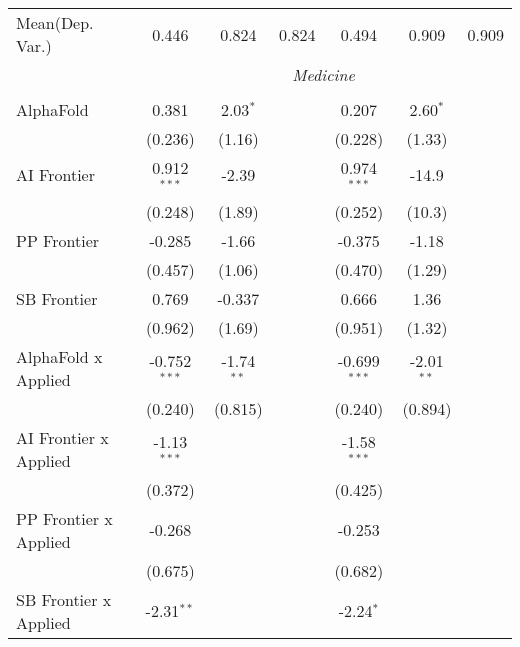 \begin{tabular}{lcccccc}
Mean(Dep. Var.) & 0.446 & 0.824 & 0.824 & 0.494 & 0.909 & 0.909 \\
 & \multicolumn{6}{c}{\textit{Medicine}} \\ \\
   AlphaFold                    & 0.381          & 2.03$^{*}$   &              & 0.207          & 2.60$^{*}$   &   \\   
                                & (0.236)        & (1.16)       &              & (0.228)        & (1.33)       &   \\   
   AI Frontier                  & 0.912$^{***}$  & -2.39        &              & 0.974$^{***}$  & -14.9        &   \\   
                                & (0.248)        & (1.89)       &              & (0.252)        & (10.3)       &   \\   
   PP Frontier                  & -0.285         & -1.66        &              & -0.375         & -1.18        &   \\   
                                & (0.457)        & (1.06)       &              & (0.470)        & (1.29)       &   \\   
   SB Frontier                  & 0.769          & -0.337       &              & 0.666          & 1.36         &   \\   
                                & (0.962)        & (1.69)       &              & (0.951)        & (1.32)       &   \\   
   AlphaFold x Applied          & -0.752$^{***}$ & -1.74$^{**}$ &              & -0.699$^{***}$ & -2.01$^{**}$ &   \\   
                                & (0.240)        & (0.815)      &              & (0.240)        & (0.894)      &   \\   
   AI Frontier x Applied        & -1.13$^{***}$  &              &              & -1.58$^{***}$  &              &   \\   
                                & (0.372)        &              &              & (0.425)        &              &   \\   
   PP Frontier x Applied        & -0.268         &              &              & -0.253         &              &   \\   
                                & (0.675)        &              &              & (0.682)        &              &   \\   
   SB Frontier x Applied        & -2.31$^{**}$   &              &              & -2.24$^{*}$    &              &   \\   

\end{tabular}
